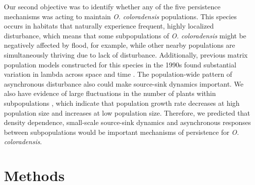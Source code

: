 \documentclass[12pt, letterpaper]{article}
\begin{document}
Our second objective was to identify whether any of the five persistence mechanisms was acting to maintain \textit{O. coloradensis} populations. This species occurs in habitats that naturally experience frequent, highly localized disturbance, which means that some subpopulations of \textit{O. coloradensis} might be negatively affected by flood, for example, while other nearby populations are simultaneously thriving due to lack of disturbance. Additionally, previous matrix population models constructed for this species in the 1990s found substantial variation in lambda across space and time \cite{Floyd1998}. The population-wide pattern of asynchronous disturbance also could make source-sink dynamics important. We also have evidence of large fluctuations in the number of plants within subpopulations \cite{Heidel202133-YearWyoming}, which indicate that population growth rate decreases at high population size and increases at low population size. Therefore, we predicted that density dependence, small-scale source-sink dynamics and asynchronous responses between subpopulations would be important mechanisms of persistence for \textit{O. coloradensis}.  


\section{Methods}
\end{document}
